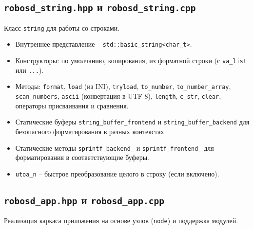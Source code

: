\documentclass[a4paper,12pt]{article}
\begin{document}
\subsection{\texttt{robosd\_string.hpp} и \texttt{robosd\_string.cpp}}

Класс \texttt{string} для работы со строками.

\begin{itemize}
    \item Внутреннее представление -- \texttt{std::basic\_string<char\_t>}.
    \item Конструкторы: по умолчанию, копирования, из форматной строки (с \texttt{va\_list} или \texttt{...}).
    \item Методы: \texttt{format}, \texttt{load} (из INI), \texttt{tryload}, \texttt{to\_number}, \texttt{to\_number\_array}, \texttt{scan\_numbers}, \texttt{ascii} (конвертация в UTF-8), \texttt{length}, \texttt{c\_str}, \texttt{clear}, операторы присваивания и сравнения.
    \item Статические буферы \texttt{string\_buffer\_frontend} и \texttt{string\_buffer\_backend} для безопасного форматирования в разных контекстах.
    \item Статические методы \texttt{sprintf\_backend\_} и \texttt{sprintf\_frontend\_} для форматирования в соответствующие буферы.
    \item \texttt{utoa\_n} -- быстрое преобразование целого в строку (если включено).
\end{itemize}

\subsection{\texttt{robosd\_app.hpp} и \texttt{robosd\_app.cpp}}

Реализация каркаса приложения на основе узлов (\texttt{node}) и поддержка модулей.
\end{document}
